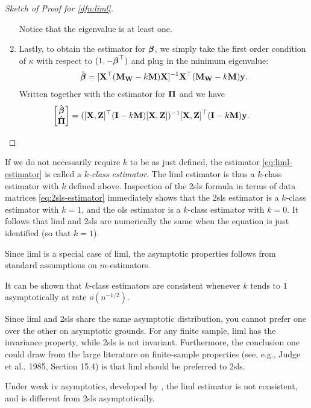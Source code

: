 \documentclass[a4paper]{article}
\begin{document}
\begin{proof}[Sketch of Proof for \autoref{dfn:liml}]
\begin{enumerate}
			Notice that the eigenvalue is at least one.
		\item
			Lastly, to obtain the estimator for $\boldsymbol{\beta}$,
			we simply take the first order condition of $\kappa$ with respect to $(1,-\boldsymbol{\beta}^\top)$
			and plug in the minimum eigenvalue:
			\begin{align*}
				\hat{\boldsymbol{\beta}} =
				[\mathbf{X}^\top(\mathbf{M}_{\mathbf{W}}-k \mathbf{M})\mathbf{X}]^{-{1}}\mathbf{X}^\top(\mathbf{M}_{\mathbf{W}}-k\mathbf{M})\mathbf{y}.
			\end{align*}
			Written together with the estimator for $\boldsymbol{\Pi}$ and we have
			\begin{align*}
				\begin{bmatrix}
					\hat{\boldsymbol{\beta}} \\ \hat{\boldsymbol{\Pi}}
				\end{bmatrix}
				&=
				(
				[\mathbf{X},\mathbf{Z}]^\top
				(\mathbf{I} - k\mathbf{M})
				[\mathbf{X},\mathbf{Z}]
				)^{-{1}}
				{[\mathbf{X},\mathbf{Z}]}^\top
				(\mathbf{I} - k\mathbf{M})
				\mathbf{y}.
				\tag*{\qedhere}
			\end{align*}
	\end{enumerate}
\end{proof}

\begin{remark}
	If we do not necessarily require $k$ to be as just defined,
	the estimator \eqref{eq:liml-estimator} is called a \emph{$k$-class estimator}.
	The \gls*{liml} estimator is thus a $k$-class estimator with $k$ defined above.
	Inspection of the \gls*{2sls} formula in terms of data matrices \eqref{eq:2sls-estimator} immediately shows that
	the \gls*{2sls} estimator is a $k$-class estimator with $k = 1$,
	and the \gls*{ols} estimator is a $k$-class estimator with $k = 0$.
	It follows that \gls*{liml} and \gls*{2sls} are numerically the same when the equation is just identified (so that $k= 1$). %
\end{remark}

\begin{remark}
	Since \gls*{liml} is a special case of \gls*{liml},
	the asymptotic properties follows from standard assumptions on $m$-estimators.
\end{remark}

\begin{remark}
	It can be shown that $k$-class estimators are consistent whenever $k$ tends to $1$ asymptotically at rate $o(n^{-1/2})$.
\end{remark}

\begin{remark}
	Since \gls*{liml} and \gls*{2sls} share the same asymptotic distribution,
	you cannot prefer one over the other on asymptotic grounds.
	For any finite sample, \gls*{liml} has the invariance property,
	while \gls*{2sls} is not invariant.
	Furthermore, the conclusion one could draw from the large literature on finite-sample properties
	(see, e.g., Judge et al., 1985, Section 15.4) is that \gls*{liml} should be preferred to \gls*{2sls}.
\end{remark}

\begin{remark}
	Under weak \gls*{iv} asymptotics,
	developed by \textcite{staiger-stock-1997},
	the \gls*{liml} estimator is not consistent,
	and is different from \gls*{2sls} asymptotically.
\end{remark}

\printglossaries
\printbibliography
\end{document}
